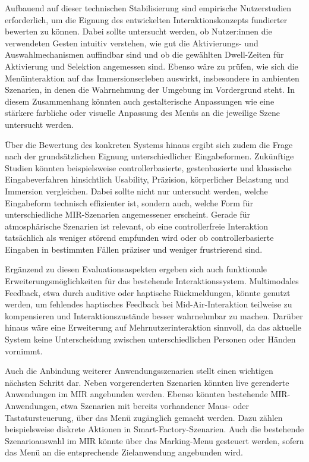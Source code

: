 Aufbauend auf dieser technischen Stabilisierung sind empirische Nutzerstudien erforderlich, um die Eignung des entwickelten Interaktionskonzepts fundierter bewerten zu können. Dabei sollte untersucht werden, ob Nutzer:innen die verwendeten Gesten intuitiv verstehen, wie gut die Aktivierungs- und Auswahlmechanismen auffindbar sind und ob die gewählten Dwell-Zeiten für Aktivierung und Selektion angemessen sind. Ebenso wäre zu prüfen, wie sich die Menüinteraktion auf das Immersionserleben auswirkt, insbesondere in ambienten Szenarien, in denen die Wahrnehmung der Umgebung im Vordergrund steht. In diesem Zusammenhang könnten auch gestalterische Anpassungen wie eine stärkere farbliche oder visuelle Anpassung des Menüs an die jeweilige Szene untersucht werden.

Über die Bewertung des konkreten Systems hinaus ergibt sich zudem die Frage nach der grund\-sätzlichen Eignung unterschiedlicher Eingabeformen. Zukünftige Studien könnten beispielsweise controllerbasierte, gestenbasierte und klassische Eingabeverfahren hinsichtlich Usability, Präzision, körperlicher Belastung und Immersion vergleichen. Dabei sollte nicht nur untersucht werden, welche Eingabeform technisch effizienter ist, sondern auch, welche Form für unterschiedliche MIR-Szenarien angemessener erscheint. Gerade für atmosphärische Szenarien ist relevant, ob eine controllerfreie Interaktion tatsächlich als weniger störend empfunden wird oder ob controllerbasierte Eingaben in bestimmten Fällen präziser und weniger frustrierend sind.

Ergänzend zu diesen Evaluationsaspekten ergeben sich auch funktionale Erweiterungs\-möglich\-keiten für das bestehende Interaktionssystem. Multimodales Feedback, etwa durch auditive oder haptische Rückmeldungen, könnte genutzt werden, um fehlendes haptisches Feedback bei Mid-Air-Interaktion teilweise zu kompensieren und Interaktionszustände besser wahrnehmbar zu machen. Darüber hinaus wäre eine Erweiterung auf Mehrnutzerinteraktion sinnvoll, da das aktuelle System keine Unterscheidung zwischen unterschiedlichen Personen oder Händen vornimmt.

Auch die Anbindung weiterer Anwendungsszenarien stellt einen wichtigen nächsten Schritt dar. Neben vorgerenderten Szenarien könnten live gerenderte Anwendungen im MIR angebunden werden. Ebenso könnten bestehende MIR-Anwendungen, etwa Szenarien mit bereits vorhandener Maus- oder Tastatursteuerung, über das Menü zugänglich gemacht werden. Dazu zählen beispielsweise diskrete Aktionen in Smart-Factory-Szenarien. Auch die bestehende Szenarioauswahl im MIR könnte über das Marking-Menu gesteuert werden, sofern das Menü an die entsprechende Zielanwendung angebunden wird.

